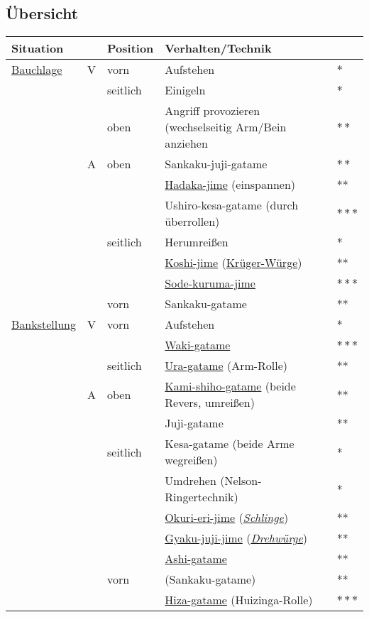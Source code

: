 \documentclass[justified, a4paper, notitlepage, captions=tableheading, nobib]{tufte-handout}
\begin{document}
\subsection{Übersicht}
\label{sec:orgd00c500}
\begin{center}
\begin{tabular}{lllll}
Situation\footnotemark &  & Position & Verhalten/Technik & \\
\hline
\hyperref[orgfae504a]{Bauchlage} & V & vorn & Aufstehen & \(\ast\)\\
 &  & seitlich & Einigeln & \(\ast\)\\
 &  & oben & Angriff provozieren (wechselseitig Arm/Bein anziehen & \(\ast \ast\)\\
 & A & oben & Sankaku-juji-gatame & \(\ast \ast\)\\
 &  &  & \hyperref[orga3070a6]{Hadaka-jime} (einspannen) & **\\
 &  &  & Ushiro-kesa-gatame (durch überrollen) & \(\ast \ast \ast\)\\
 &  & seitlich & Herumreißen & *\\
 &  &  & \hyperref[orgdbeec5d]{Koshi-jime} (\hyperref[org2f16c30]{Krüger-Würge}) & **\\
 &  &  & \hyperref[org66d000c]{Sode-kuruma-jime} & \(\ast \ast \ast\)\\
 &  & vorn & Sankaku-gatame & **\\
\hline
\hyperref[org37bd524]{Bankstellung} & V & vorn & Aufstehen & *\\
 &  &  & \hyperref[orgf02fe16]{Waki-gatame} & \(\ast \ast \ast\)\\
 &  & seitlich & \hyperref[org554c172]{Ura-gatame} (Arm-Rolle) & **\\
 & A & oben & \hyperref[org79c6e2f]{Kami-shiho-gatame} (beide Revers, umreißen) & **\\
 &  &  & Juji-gatame & **\\
 &  & seitlich & Kesa-gatame (beide Arme wegreißen) & *\\
 &  &  & Umdrehen (Nelson-Ringertechnik) & *\\
 &  &  & \hyperref[org41b7fb1]{Okuri-eri-jime} (\emph{\hyperref[org4110e60]{Schlinge}}) & **\\
 &  &  & \hyperref[org8b33e39]{Gyaku-juji-jime} (\emph{\hyperref[org5a5933b]{Drehwürge}}) & **\\
 &  &  & \hyperref[org8026a3f]{Ashi-gatame} & **\\
 &  & vorn & (Sankaku-gatame) & **\\
 &  &  & \hyperref[orge854c9c]{Hiza-gatame} (Huizinga-Rolle)\footnotemark & \(\ast \ast \ast\)\\

\end{tabular}
\end{center}
\end{document}
